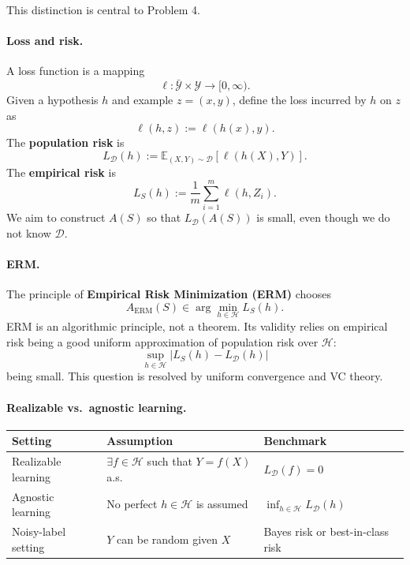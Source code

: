 \documentclass[11pt,a4paper]{article}
\theoremstyle{definition}
\begin{document}
\begin{center}
\end{center}

This distinction is central to Problem 4.

\paragraph{Loss and risk.}
A loss function is a mapping
\[
\ell : \bar{\mathcal{Y}} \times \mathcal{Y} \to [0, \infty).
\]
Given a hypothesis $h$ and example $z = (x, y)$, define the loss incurred by $h$ on $z$ as
\[
\ell(h, z) := \ell(h(x), y).
\]
The \textbf{population risk} is
\[
\boxed{L_{\mathcal{D}}(h) := \mathbb{E}_{(X, Y) \sim \mathcal{D}}[\ell(h(X), Y)].}
\]
The \textbf{empirical risk} is
\[
\boxed{L_S(h) := \frac{1}{m} \sum_{i=1}^m \ell(h, Z_i).}
\]
We aim to construct $A(S)$ so that $L_{\mathcal{D}}(A(S))$ is small, even though we do not know $\mathcal{D}$.

\paragraph{ERM.}
The principle of \textbf{Empirical Risk Minimization (ERM)} chooses
\[
\boxed{A_{\text{ERM}}(S) \in \arg \min_{h \in \mathcal{H}} L_S(h).}
\]
ERM is an algorithmic principle, not a theorem. Its validity relies on empirical risk being a good uniform approximation of population risk over $\mathcal{H}$:
\[
\sup_{h \in \mathcal{H}} |L_S(h) - L_{\mathcal{D}}(h)|
\]
being small. This question is resolved by uniform convergence and VC theory.

\paragraph{Realizable vs.\ agnostic learning.}
\begin{center}
\begin{tabular}{|l|l|l|}
\hline
\textbf{Setting} & \textbf{Assumption} & \textbf{Benchmark} \\ \hline
Realizable learning & $\exists f \in \mathcal{H}$ such that $Y = f(X)$ a.s. & $L_{\mathcal{D}}(f) = 0$ \\ \hline
Agnostic learning & No perfect $h \in \mathcal{H}$ is assumed & $\inf_{h \in \mathcal{H}} L_{\mathcal{D}}(h)$ \\ \hline
Noisy-label setting & $Y$ can be random given $X$ & Bayes risk or best-in-class risk \\ \hline
\end{tabular}
\end{center}
\end{document}
